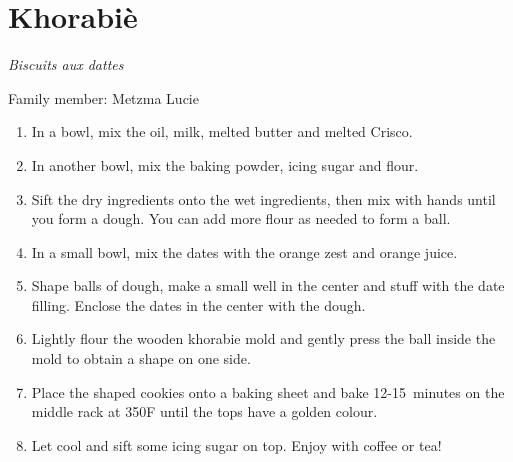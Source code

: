 \chapter{Khorabiè}
\label{ch:khorabie}


\textit{Biscuits aux dattes}

Family member: Metzma Lucie



\begin{enumerate}
    \item In a bowl, mix the oil, milk, melted butter and melted Crisco.
    \item In another bowl, mix the baking powder, icing sugar and flour.
    \item Sift the dry ingredients onto the wet ingredients, then mix with hands until you form a dough. You can add more flour as needed to form a ball.
    \item In a small bowl, mix the dates with the orange zest and orange juice.
    \item Shape balls of dough, make a small well in the center and stuff with the date filling. Enclose the dates in the center with the dough.
    \item Lightly flour the wooden khorabie mold and gently press the ball inside the mold to obtain a shape on one side.
    \item Place the shaped cookies onto a baking sheet and bake 12-15~minutes on the middle rack at 350\degree F until the tops have a golden colour.
    \item Let cool and sift some icing sugar on top. Enjoy with coffee or tea!
\end{enumerate}

